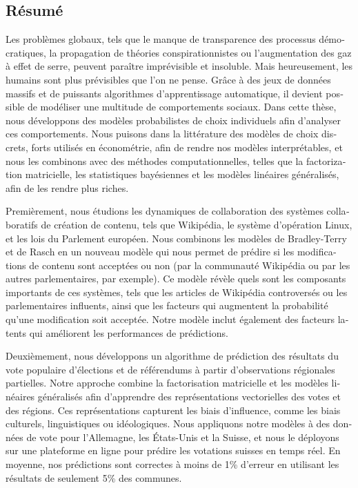 \begin{otherlanguage}{french}
	\chapter*{Résumé}

	Les problèmes globaux, tels que le manque de transparence des processus démocratiques, la propagation de théories conspirationnistes ou l'augmentation des gaz à effet de serre, peuvent paraître imprévisible et insoluble.
	Mais heureusement, les humains sont plus prévisibles que l'on ne pense.
	Grâce à des jeux de données massifs et de puissants algorithmes d'apprentissage automatique, il devient possible de modéliser une multitude de comportements sociaux.
	Dans cette thèse, nous développons des modèles probabilistes de choix individuels afin d'analyser ces comportements.
	Nous puisons dans la littérature des modèles de choix discrets, forts utilisés en économétrie, afin de rendre nos modèles interprétables, et nous les combinons avec des méthodes computationnelles, telles que la factorization matricielle, les statistiques bayésiennes et les modèles linéaires généralisés, afin de les rendre plus riches.

	Premièrement, nous étudions les dynamiques de collaboration des systèmes collaboratifs de création de contenu, tels que Wikipédia, le système d'opération Linux, et les lois du Parlement européen.
	Nous combinons les modèles de Bradley-Terry et de Rasch en un nouveau modèle qui nous permet de prédire si les modifications de contenu sont acceptées ou non (par la communauté Wikipédia ou par les autres parlementaires, par exemple).
	Ce modèle révèle quels sont les composants importants de ces systèmes, tels que les articles de Wikipédia controversés ou les parlementaires influents, ainsi que les facteurs qui augmentent la probabilité qu'une modification soit acceptée.
	Notre modèle inclut également des facteurs latents qui améliorent les performances de prédictions.

	Deuxièmement, nous développons un algorithme de prédiction des résultats du vote populaire d'élections et de référendums à partir d'observations régionales partielles.
	Notre approche combine la factorisation matricielle et les modèles linéaires généralisés afin d'apprendre des représentations vectorielles des votes et des régions.
	Ces représentations capturent les biais d'influence, comme les biais culturels, linguistiques ou idéologiques.
	Nous appliquons notre modèles à des données de vote pour l'Allemagne, les États-Unis et la Suisse, et nous le déployons sur une plateforme en ligne pour prédire les votations suisses en temps réel.
	En moyenne, nos prédictions sont correctes à moins de 1\% d'erreur en utilisant les résultats de seulement 5\% des communes.


\end{otherlanguage}
